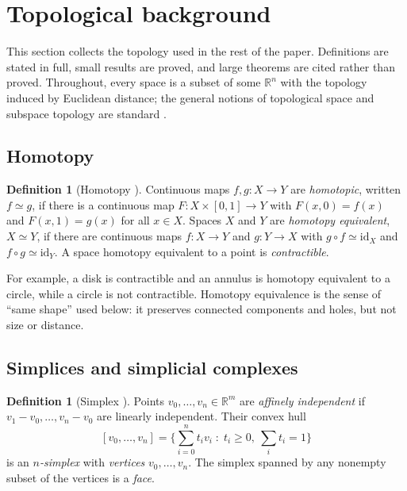\documentclass{article}
\newcommand{\R}{\mathbb{R}}
\theoremstyle{definition}
\newtheorem{definition}[theorem]{Definition}
\theoremstyle{remark}
\begin{document}
\section{Topological background}\label{sec:topology}
This section collects the topology used in the rest of the paper.
Definitions are stated in full, small results are proved, and large theorems are cited rather than proved.
Throughout, every space is a subset of some $\R^n$ with the topology induced by Euclidean distance; the general notions of topological space and subspace topology are standard \parencite{munkres2000topology}.

\subsection{Homotopy}
\begin{definition}[Homotopy {\parencite{hatcher2001}}]
Continuous maps $f, g : X \to Y$ are \emph{homotopic}, written $f \simeq g$, if there is a continuous map $F : X \times [0,1] \to Y$ with $F(x,0) = f(x)$ and $F(x,1) = g(x)$ for all $x \in X$.
Spaces $X$ and $Y$ are \emph{homotopy equivalent}, $X \simeq Y$, if there are continuous maps $f : X \to Y$ and $g : Y \to X$ with $g \circ f \simeq \mathrm{id}_X$ and $f \circ g \simeq \mathrm{id}_Y$.
A space homotopy equivalent to a point is \emph{contractible}.
\end{definition}
For example, a disk is contractible and an annulus is homotopy equivalent to a circle, while a circle is not contractible.
Homotopy equivalence is the sense of ``same shape'' used below: it preserves connected components and holes, but not size or distance.

\subsection{Simplices and simplicial complexes}
\begin{definition}[Simplex {\parencite{hatcher2001}}]
Points $v_0, \dots, v_n \in \R^m$ are \emph{affinely independent} if $v_1 - v_0, \dots, v_n - v_0$ are linearly independent.
Their convex hull
\[
  [v_0, \dots, v_n] = \Big\{ \textstyle\sum_{i=0}^n t_i v_i \;:\; t_i \ge 0,\ \sum_i t_i = 1 \Big\}
\]
is an \emph{$n$-simplex} with \emph{vertices} $v_0, \dots, v_n$.
The simplex spanned by any nonempty subset of the vertices is a \emph{face}.
\end{definition}
\end{document}
